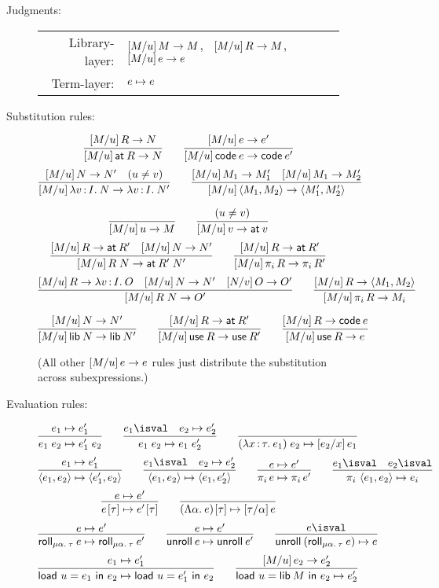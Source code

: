 \documentclass[11pt]{article}
\begin{document}

\begin{figure}
  \centering
  \begin{description}
  \item[Judgments:]\hfill

    \begin{tabular}{rl}
      Library-layer:&
      $[{{M}/{u}}]\,{M} \to M$, \ $[{{M}/{u}}]\,{R} \to M$, \ $[{{M}/{u}}]\,{e} \to e$\\
      Term-layer:& $e \mapsto e$
    \end{tabular}

  \item[Substitution rules:]
    \[
    \infer{\sub{M}{u}{\at{R}} \to N}{\sub{M}{u}{R} \to N} \qquad
    \infer{\sub{M}{u}{\code{e}} \to \code{e'}}{
      \sub{M}{u}{e} \to e'}
    \]\[
    \infer{\sub{M}{u}{\lam{v}{I}{N}} \to \lam{v}{I}{N'}}{
      \sub{M}{u}{N} \to N' &
      (u \ne v)} \qquad
    \infer{\sub{M}{u}{\<M_1, M_2\>} \to \<M_1', M_2'\>}{
      \sub{M}{u}{M_1} \to M_1' &
      \sub{M}{u}{M_1} \to M_2'}
    \]

    \[
    \infer{\sub{M}{u}{u} \to M}{} \qquad
    \infer{\sub{M}{u}{v} \to \at{v}}{(u \ne v)}
    \]\[
    \infer{\sub{M}{u}{R \ap N} \to \at{R' \ap N'}}{
      \sub{M}{u}{R} \to \at{R'} &
      \sub{M}{u}{N} \to N'}
    \qquad
    \infer{\sub{M}{u}{\proj{i}{R}} \to \proj{i}{R'}}{
      \sub{M}{u}{R} \to \at{R'}
    }
    \]\[
    \infer{\sub{M}{u}{R \ap N} \to O'}{
      \sub{M}{u}{R} \to \lam{v}{I}{O} &
      \sub{M}{u}{N} \to N' &
      \sub{N}{v}{O} \to O'}
    \qquad
    \infer{\sub{M}{u}{\proj{i}{R}} \to M_i}{
      \sub{M}{u}{R} \to \<M_1, M_2\>}
    \]

    \[
    \infer{\sub{M}{u}{\lib{N}} \to \lib{N'}}{
      \sub{M}{u}{N} \to N'}
    \qquad
    \infer{\sub{M}{u}{\use{R}} \to \use{R'}}{
      \sub{M}{u}{R} \to \at{R'}}
    \qquad
    \infer{\sub{M}{u}{\use{R}} \to e}{\sub{M}{u}{R} \to \code{e}}
    \]

    (All other $[{{M}/{u}}]\,{e} \to e$ rules just distribute the substitution
    across subexpressions.)

  \item[Evaluation rules:]
    \[
    \infer{e_1 \ap e_2 \step e_1' \ap e_2}{e_1 \step e_1'} \qquad
    \infer{e_1 \ap e_2 \step e_1 \ap e_2'}{e_1 \isval & e_2 \step e_2'} \qquad
    \infer{(\lam{x}{\tau}{e_1}) \ap e_2 \step \sub{e_2}{x}{e_1}}{}
    \]\[
    \infer{\<e_1, e_2\> \step \<e_1', e_2\>}{e_1 \step e_1'} \qquad
    \infer{\<e_1, e_2\> \step \<e_1, e_2'\>}{e_1 \isval & e_2 \step e_2'} \qquad
    \infer{\proj{i}{e} \step \proj{i}{e'}}{e \step e'} \qquad
    \infer{\proj{i}{\<e_1, e_2\>} \step e_i}{e_1 \isval & e_2 \isval}
    \]\[
    \infer{\Ap{e}{\tau} \step \Ap{e'}{\tau}}{e \step e'} \qquad
    \infer{\Ap{(\Lam{\alpha}{e})}{\tau} \step \sub{\tau}{\alpha}{e}}{}
    \]\[
    \infer{\roll{\alpha}{\tau}{e} \step \roll{\alpha}{\tau}{e'}}{e \step e'} \qquad
    \infer{\unroll{e} \step \unroll{e'}}{e \step e'} \qquad
    \infer{\unroll{(\roll{\alpha}{\tau}{e})} \step e}{e \isval}
    \]\[
    \infer{\load{u}{e_1}{e_2} \step \load{u}{e_1'}{e_2}}{e_1 \step e_1'} \qquad
    \infer{\load{u}{\lib{M}}{e_2} \step e_2'}{\sub{M}{u}{e_2} \to e_2'}
    \]
  \end{description}


\end{figure}
\end{document}
